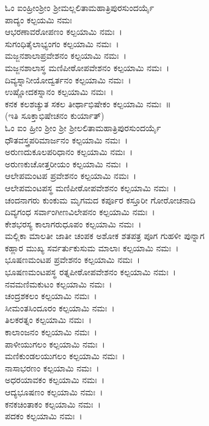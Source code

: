 ಓಂ ಐಂಹ್ರೀಂಶ್ರೀಂ ಶ್ರೀಮಲ್ಲಲಿತಾಮಹಾತ್ರಿಪುರಸುಂದರ್ಯೈ\\
ಪಾದ್ಯಂ ಕಲ್ಪಯಮಿ ನಮಃ\\
ಆಭರಣಾವರೋಪಣಂ ಕಲ್ಪಯಾಮಿ ನಮಃ~।\\
ಸುಗಂಧಿತೈಲಾಭ್ಯಂಗಂ ಕಲ್ಪಯಾಮಿ ನಮಃ~।\\
ಮಜ್ಜನಶಾಲಾಪ್ರವೇಶನಂ ಕಲ್ಪಯಾಮಿ ನಮಃ~।\\
ಮಜ್ಜನಶಾಲಾಸ್ಥ ಮಣಿಪೀಠೋಪವೇಶನಂ ಕಲ್ಪಯಾಮಿ ನಮಃ~।\\
ದಿವ್ಯಸ್ನಾನೀಯೋದ್ವರ್ತನಂ ಕಲ್ಪಯಾಮಿ ನಮಃ~।\\
ಉಷ್ಣೋದಕಸ್ನಾನಂ ಕಲ್ಪಯಾಮಿ ನಮಃ~।\\
ಕನಕ ಕಲಶಚ್ಯುತ ಸಕಲ ತೀರ್ಥಾಭಿಷೇಕಂ ಕಲ್ಪಯಾಮಿ ನಮಃ~॥\\
(ಇತಿ ಸೂಕ್ತಾಭಿಷೇಚನಂ ಕುರ್ಯಾತ್)\\
ಓಂ ಐಂ ಹ್ರೀಂ ಶ್ರೀಂ ಶ್ರೀ ಶ್ರೀಲಲಿತಾಮಹಾತ್ರಿಪುರಸುಂದರ್ಯೈ \\ಧೌತವಸ್ತ್ರಪರಿಮಾರ್ಜನಂ ಕಲ್ಪಯಾಮಿ ನಮಃ~।\\
ಅರುಣದುಕೂಲಪರಿಧಾನಂ ಕಲ್ಪಯಾಮಿ ನಮಃ~।\\
ಅರುಣಕುಚೋತ್ತರೀಯಂ ಕಲ್ಪಯಾಮಿ ನಮಃ~।\\
ಆಲೇಪಮಂಟಪ ಪ್ರವೇಶನಂ ಕಲ್ಪಯಾಮಿ ನಮಃ~।\\
ಆಲೇಪಮಂಟಪಸ್ಥ ಮಣಿಪೀಠೋಪವೇಶನಂ ಕಲ್ಪಯಾಮಿ ನಮಃ~।\\
ಚಂದನಾಗರು ಕುಂಕುಮ ಮೃಗಮದ ಕರ್ಪೂರ ಕಸ್ತೂರೀ ಗೋರೋಚನಾದಿ\\ ದಿವ್ಯಗಂಧ ಸರ್ವಾಂಗೀಣವಿಲೇಪನಂ ಕಲ್ಪಯಾಮಿ ನಮಃ~।\\
ಕೇಶಭರಸ್ಯ ಕಾಲಾಗರುಧೂಪಂ ಕಲ್ಪಯಾಮಿ ನಮಃ~।\\
ಮಲ್ಲಿಕಾ ಮಾಲತೀ ಜಾತೀ ಚಂಪಕ ಅಶೋಕ ಶತಪತ್ರ ಪೂಗ ಗುಹಳೀ ಪುನ್ನಾಗ \\ಕಹ್ಲಾರ ಮುಖ್ಯ ಸರ್ವರ್ತುಕುಸುಮ ಮಾಲಾಃ ಕಲ್ಪಯಾಮಿ ನಮಃ~।\\
ಭೂಷಣಮಂಟಪ ಪ್ರವೇಶನಂ ಕಲ್ಪಯಾಮಿ ನಮಃ~।\\
ಭೂಷಣಮಂಟಪಸ್ಥ ರತ್ನಪೀಠೋಪವೇಶನಂ ಕಲ್ಪಯಾಮಿ ನಮಃ~।\\
ನವಮಣಿಮಕುಟಂ ಕಲ್ಪಯಾಮಿ ನಮಃ~।\\
ಚಂದ್ರಶಕಲಂ ಕಲ್ಪಯಾಮಿ ನಮಃ~।\\
ಸೀಮಂತಸಿಂದೂರಂ ಕಲ್ಪಯಾಮಿ ನಮಃ~।\\
ತಿಲಕರತ್ನಂ ಕಲ್ಪಯಾಮಿ ನಮಃ~।\\
ಕಾಲಾಂಜನಂ ಕಲ್ಪಯಾಮಿ ನಮಃ~।\\
ಪಾಳೀಯುಗಲಂ ಕಲ್ಪಯಾಮಿ ನಮಃ~।\\
ಮಣಿಕುಂಡಲಯುಗಲಂ ಕಲ್ಪಯಾಮಿ ನಮಃ~।\\
ನಾಸಾಭರಣಂ ಕಲ್ಪಯಾಮಿ ನಮಃ~।\\
ಅಧರಯಾವಕಂ ಕಲ್ಪಯಾಮಿ ನಮಃ~।\\
ಆದ್ಯಭೂಷಣಂ ಕಲ್ಪಯಾಮಿ ನಮಃ~।\\
ಕನಕಚಿಂತಾಕಂ ಕಲ್ಪಯಾಮಿ ನಮಃ~।\\
ಪದಕಂ ಕಲ್ಪಯಾಮಿ ನಮಃ~।\\
